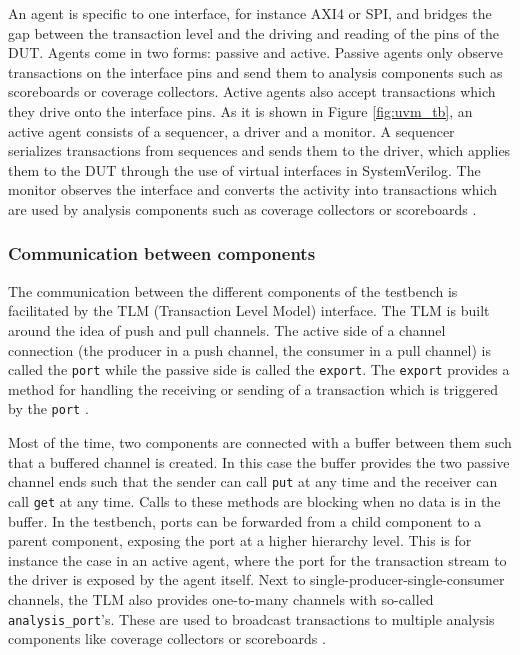 \documentclass[11pt,a4paper]{report}
\newcommand{\ttt}{\texttt}
\begin{document}
An agent is specific to one interface, for instance AXI4 or SPI, and bridges the gap between the transaction level
and the driving and reading of the pins of the DUT. Agents come in two forms: passive and active. Passive agents only
observe transactions on the interface pins and send them to analysis components such as scoreboards or coverage
collectors. Active agents also accept transactions which they drive onto the interface pins. As it is shown in Figure \ref{fig:uvm_tb}, an active agent consists of a sequencer, a driver and a monitor. A sequencer serializes transactions from sequences and sends them to the driver, which applies them to the DUT through the use of virtual interfaces in SystemVerilog. The monitor observes the interface and converts the activity into transactions which are used by analysis components such as coverage collectors or scoreboards \cite[ch. 4.3]{mehta2018asic}.

\subsubsection{Communication between components} %

The communication between the different components of the testbench is facilitated by the TLM (Transaction Level
Model) interface. The TLM is built around the idea of push and pull channels. The active side of a channel connection
(the producer in a push channel, the consumer in a pull channel) is called the \ttt{port} while the passive side is
called the \ttt{export}. The \ttt{export} provides a method for handling the receiving or sending of a transaction
which is triggered by the \ttt{port} \cite[ch. 4.5]{mehta2018asic}. 

Most of the time, two components are connected with a buffer between them such
that a buffered channel is created. In this case the buffer provides the two passive channel ends such that the
sender can call \ttt{put} at any time and the receiver can call \ttt{get} at any time. Calls to these methods are
blocking when no data is in the buffer. In the testbench, ports can be forwarded from a child component to a parent
component, exposing the port at a higher hierarchy level. This is for instance the case in an active agent, where the
port for the transaction stream to the driver is exposed by the agent itself. Next to single-producer-single-consumer
channels, the TLM also provides one-to-many channels with so-called \ttt{analysis\_port}'s. These are used to
broadcast transactions to multiple analysis components like coverage collectors or scoreboards \cite[ch. 4.5]{mehta2018asic}.
\end{document}
